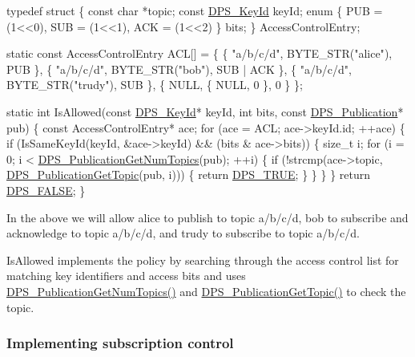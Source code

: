 \begin{DoxyCodeInclude}
\textcolor{keyword}{typedef} \textcolor{keyword}{struct }\{
    \textcolor{keyword}{const} \textcolor{keywordtype}{char} *topic;
    \textcolor{keyword}{const} \hyperlink{struct___d_p_s___key_id}{DPS\_KeyId} keyId;
    \textcolor{keyword}{enum} \{
        PUB = (1<<0),
        SUB = (1<<1),
        ACK = (1<<2)
    \} bits;
\} AccessControlEntry;

\textcolor{keyword}{static} \textcolor{keyword}{const} AccessControlEntry ACL[] = \{
    \{ \textcolor{stringliteral}{"a/b/c/d"}, BYTE\_STR(\textcolor{stringliteral}{"alice"}), PUB       \},
    \{ \textcolor{stringliteral}{"a/b/c/d"}, BYTE\_STR(\textcolor{stringliteral}{"bob"}),   SUB | ACK \},
    \{ \textcolor{stringliteral}{"a/b/c/d"}, BYTE\_STR(\textcolor{stringliteral}{"trudy"}), SUB       \},
    \{ NULL,      \{ NULL, 0 \},       0         \}
\};

\textcolor{keyword}{static} \textcolor{keywordtype}{int} IsAllowed(\textcolor{keyword}{const} \hyperlink{struct___d_p_s___key_id}{DPS\_KeyId}* keyId, \textcolor{keywordtype}{int} bits, \textcolor{keyword}{const} 
      \hyperlink{group__publication_ga0d439693474aa54e27f3d45a054696ac}{DPS\_Publication}* pub)
\{
    \textcolor{keyword}{const} AccessControlEntry* ace;
    \textcolor{keywordflow}{for} (ace = ACL; ace->keyId.id; ++ace) \{
        \textcolor{keywordflow}{if} (IsSameKeyId(keyId, &ace->keyId) && (bits & ace->bits)) \{
            \textcolor{keywordtype}{size\_t} i;
            \textcolor{keywordflow}{for} (i = 0; i < \hyperlink{group__publication_gaee6fc3b13484faacff0d26646778f777}{DPS\_PublicationGetNumTopics}(pub); ++i) \{
                \textcolor{keywordflow}{if} (!strcmp(ace->topic, \hyperlink{group__publication_ga143a5c6fbe0bdf1725e841f122582432}{DPS\_PublicationGetTopic}(pub, i))) \{
                    \textcolor{keywordflow}{return} \hyperlink{dps_8h_a4a173ed2665cea74e58558d99b377ab3}{DPS\_TRUE};
                \}
            \}
        \}
    \}
    \textcolor{keywordflow}{return} \hyperlink{dps_8h_ad8b397975a479b996ef223367d8835a9}{DPS\_FALSE};
\}
\end{DoxyCodeInclude}
In the above we will allow {\ttfamily alice} to publish to topic {\ttfamily a/b/c/d}, {\ttfamily bob} to subscribe and acknowledge to topic {\ttfamily a/b/c/d}, and {\ttfamily trudy} to subscribe to topic {\ttfamily a/b/c/d}.

{\ttfamily Is\+Allowed} implements the policy by searching through the access control list for matching key identifiers and access bits and uses \hyperlink{group__publication_gaee6fc3b13484faacff0d26646778f777}{D\+P\+S\+\_\+\+Publication\+Get\+Num\+Topics()} and \hyperlink{group__publication_ga143a5c6fbe0bdf1725e841f122582432}{D\+P\+S\+\_\+\+Publication\+Get\+Topic()} to check the topic.\hypertarget{tutorials-security_implementing-subscription-control}{}\subsubsection{Implementing subscription control}\label{tutorials-security_implementing-subscription-control}

